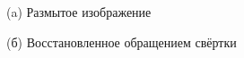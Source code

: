 \begin{figure}[H]
\begin{minipage}[t]{0.3\linewidth}
(a) Размытое изображение\\ 
\end{minipage}
\hfill
\begin{minipage}[t]{0.3\linewidth}
(б) Восстановленное обращением свёртки\\ 
\end{minipage}
\hfill
\begin{minipage}[t]{0.3\linewidth}

\end{minipage}
\end{figure}
